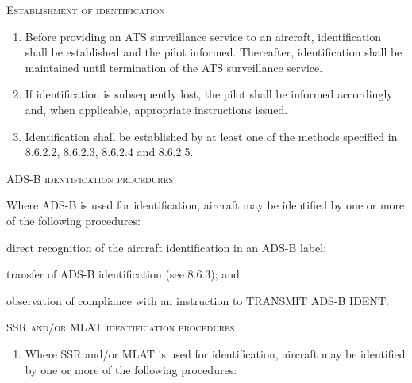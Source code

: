 \documentclass[../vATM.tex]{subfiles}
\begin{document}
    \begin{enumeratesc}
    	\item \textsc{Establishment of identification}
    	\begin{enumerate}
    		\item Before providing an ATS surveillance service to an aircraft, identification shall be established and the pilot informed. Thereafter, identification shall be maintained until termination of the ATS surveillance service.
    		\item If identification is subsequently lost, the pilot shall be informed accordingly and, when applicable, appropriate instructions issued.
    		\item Identification shall be established by at least one of the methods specified in 8.6.2.2, 8.6.2.3, 8.6.2.4 and 8.6.2.5.
    	\end{enumerate}
    
    	\item \textsc{ADS-B identification procedures}
    	\begin{enumempty}
    		\item Where ADS-B is used for identification, aircraft may be identified by one or more of the following procedures:
    	\end{enumempty}
    	\begin{enumalph}
    		\item direct recognition of the aircraft identification in an ADS-B label;
    		\item transfer of ADS-B identification (see 8.6.3); and
    		\item observation of compliance with an instruction to TRANSMIT ADS-B IDENT.
    	\end{enumalph}
    	
    	\item \textsc{SSR and/or MLAT identification procedures}
    	\begin{enumerate}
    		\item Where SSR and/or MLAT is used for identification, aircraft may be identified by one or more of the following procedures:
    		

\end{enumerate}
\end{enumeratesc}
\end{document}
